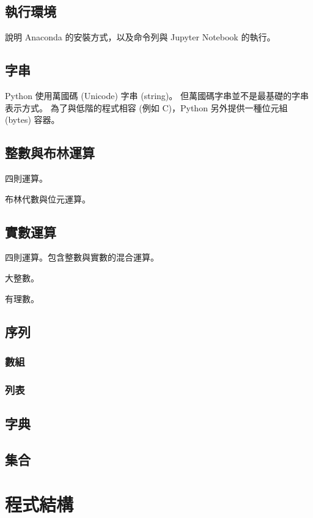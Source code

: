 \documentclass[a4paper,12pt]{book}
\begin{document}
\chapter{執行環境}

說明 Anaconda 的安裝方式，以及命令列與 Jupyter Notebook 的執行。

\chapter{字串}

Python 使用萬國碼 (Unicode) 字串 (string)。
但萬國碼字串並不是最基礎的字串表示方式。
為了與低階的程式相容 (例如 C)，Python 另外提供一種位元組 (bytes) 容器。

\chapter{整數與布林運算}

四則運算。

布林代數與位元運算。

\chapter{實數運算}

四則運算。包含整數與實數的混合運算。

大整數。

有理數。

\chapter{序列}

\section{數組}

\section{列表}

\chapter{字典}

\chapter{集合}

\part{程式結構}
\end{document}
